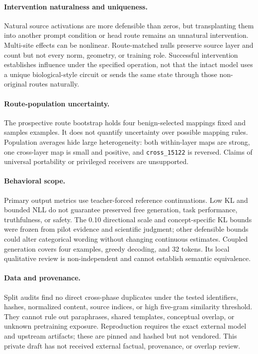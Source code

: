 \documentclass[10pt]{article}
\begin{document}
\paragraph{Intervention naturalness and uniqueness.}
Natural source activations are more defensible than zeros, but transplanting them into another prompt condition or head route remains an unnatural intervention. Multi-site effects can be nonlinear. Route-matched nulls preserve source layer and count but not every norm, geometry, or training role. Successful intervention establishes influence under the specified operation, not that the intact model uses a unique biological-style circuit or sends the same state through those non-original routes naturally.

\paragraph{Route-population uncertainty.}
The prospective route bootstrap holds four benign-selected mappings fixed and samples examples. It does not quantify uncertainty over possible mapping rules. Population averages hide large heterogeneity: both within-layer maps are strong, one cross-layer map is small and positive, and \texttt{cross\_15122} is reversed. Claims of universal portability or privileged receivers are unsupported.

\paragraph{Behavioral scope.}
Primary output metrics use teacher-forced reference continuations. Low KL and bounded NLL do not guarantee preserved free generation, task performance, truthfulness, or safety. The 0.10 directional scale and concept-specific KL bounds were frozen from pilot evidence and scientific judgment; other defensible bounds could alter categorical wording without changing continuous estimates. Coupled generation covers four examples, greedy decoding, and 32 tokens. Its local qualitative review is non-independent and cannot establish semantic equivalence.

\paragraph{Data and provenance.}
Split audits find no direct cross-phase duplicates under the tested identifiers, hashes, normalized content, source indices, or high five-gram similarity threshold. They cannot rule out paraphrases, shared templates, conceptual overlap, or unknown pretraining exposure. Reproduction requires the exact external model and upstream artifacts; these are pinned and hashed but not vendored. This private draft has not received external factual, provenance, or overlap review.
\end{document}
